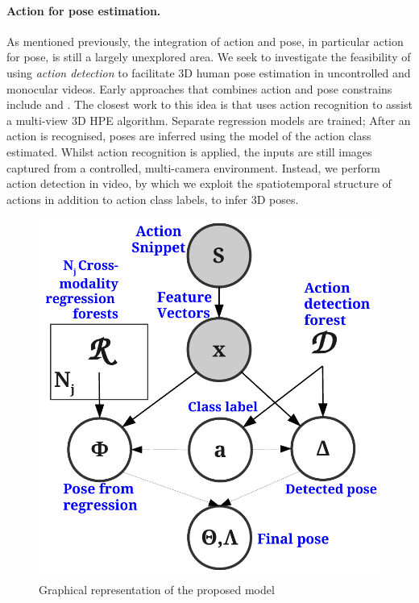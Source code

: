 \paragraph{Action for pose estimation.}
As mentioned previously, the integration of action and pose, in particular action for pose, is still a largely unexplored area. We seek to investigate the feasibility of using \emph{action detection} to facilitate 3D human pose estimation in uncontrolled and monocular videos.
Early approaches that combines action and pose constrains include \cite{Yu2010} and \cite{Raja2011}.
The closest work to this idea is \cite{Yao2012} that uses action recognition to assist a multi-view 3D HPE algorithm. Separate regression models are trained; After an action is recognised, poses are inferred using the model of the action class estimated. 
Whilst action recognition is applied, the inputs are still images captured from a controlled, multi-camera environment. 
Instead, we perform action detection in video, by which we exploit the spatiotemporal structure of actions in addition to action class labels, to infer 3D poses.

\begin{figure}
	\centering
	\includegraphics[width=0.35\linewidth]{fig/body/figure4.pdf}
	\caption{Graphical representation of the proposed model} 
	\label{fig/body/figure4gm}
\end{figure}


